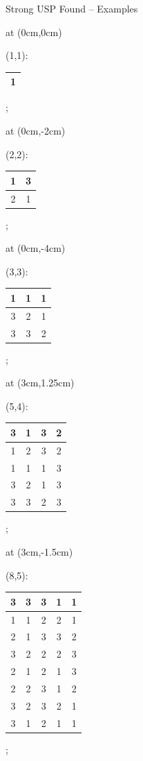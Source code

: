 \documentclass[t,10pt,
mathserif,xcolor=dvipsnames]{beamer}
\begin{document}
\begin{myframe}{Strong USP Found -- Examples}

  \tikzoverlay[text width=3cm] at (0cm,0cm) {
    (1,1):\\[.5ex]
    \begin{tabular}{|c|}
      \hline
      1 \\ \hline
    \end{tabular}
  };
  
  \tikzoverlay[text width=3cm] at (0cm,-2cm) {
    (2,2):\\[.5ex]
    \begin{tabular}{|c|c|}
      \hline
      1&3 \\ \hline
      2&1 \\ \hline
    \end{tabular}
  };
  
  \tikzoverlay[text width=3cm] at (0cm,-4cm) {
    (3,3):\\[.5ex]
    \begin{tabular}{|c|c|c|}
      \hline
      1&1&1 \\ \hline
      3&2&1 \\ \hline
      3&3&2 \\ \hline
    \end{tabular}
  };
  
  
  \tikzoverlay[text width=3cm] at (3cm,1.25cm) {
    (5,4):\\[.5ex]
    \begin{tabular}{|c|c|c|c|}
      \hline
      3&1&3&2 \\ \hline
      1&2&3&2 \\ \hline
      1&1&1&3 \\ \hline 
      3&2&1&3 \\ \hline 
      3&3&2&3 \\ \hline
    \end{tabular}
  };
  
  \tikzoverlay[text width=3cm] at (3cm,-1.5cm) {
  (8,5):\\[.5ex]
  \begin{tabular}{|c|c|c|c|c|}
    \hline
    3&3&3&1&1 \\ \hline
    1&1&2&2&1 \\ \hline
    2&1&3&3&2 \\ \hline
    3&2&2&2&3 \\ \hline
    2&1&2&1&3 \\ \hline
    2&2&3&1&2 \\ \hline
    3&2&3&2&1 \\ \hline
    3&1&2&1&1 \\ \hline
  \end{tabular}
  };


\end{myframe}
\end{document}
